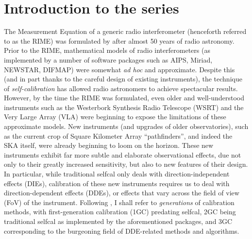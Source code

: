 \documentclass{aa}
\begin{document}

\maketitle

\section*{Introduction to the series}

The Measurement Equation of a generic radio interferometer (henceforth referred to as the RIME) was formulated by \citet{ME1} after almost 50 years of radio astronomy. Prior to the RIME, mathematical models of radio interferometers (as implemented by a number of software packages such as AIPS, Miriad, NEWSTAR, DIFMAP) were somewhat \emph{ad hoc} and approximate. Despite this (and in part thanks to the careful design of existing instruments), the technique of {\em self-calibration} \citep{Cornwell:selfcal} has allowed radio astronomers to achieve spectacular results. However, by the time the RIME was formulated, even older and well-understood instruments such as the Westerbork Synthesis Radio Telescope (WSRT) and the Very Large Array (VLA) were beginning to expose the limitations of these approximate models. New instruments (and upgrades of older observatories), such as the current crop of Square Kilometer Array \citep{Schilizzi:SKA} ``pathfinders'', and indeed the SKA itself, were already beginning to loom on the horizon. These new instruments exhibit far more subtle and elaborate observational effects, due not only to their greatly increased sensitivity, but also to new features of their design. In particular, while traditional selfcal only deals with direction-independent effects (DIEs), calibration of these new instruments requires us to deal with direction-dependent effects (DDEs), or effects that vary across the field of view (FoV) of the instrument. Following \citet{meqtrees}, I shall refer to \emph{generations} of calibration methods, with first-generation calibration (1GC) predating selfcal, 2GC being traditional selfcal as implemented by the aforementioned packages, and 3GC corresponding to the burgeoning field of DDE-related methods and algorithms. 
\end{document}
